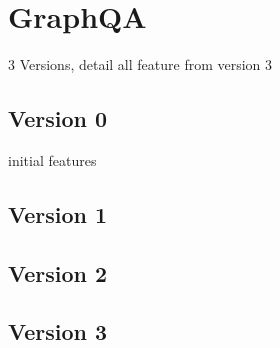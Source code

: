 \chapter{GraphQA}
\label{chap:graphqa}

3 Versions, detail all feature from version 3

\section{Version 0}
initial features

\section{Version 1}

\section{Version 2}

\section{Version 3}
